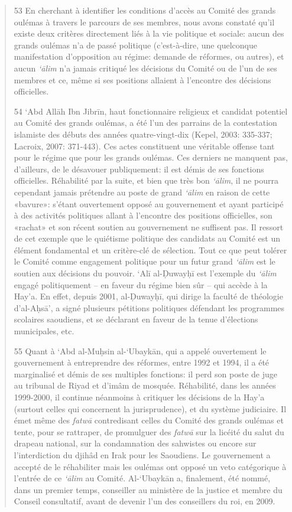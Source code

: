 \begin{quote}
53 En cherchant à identifier les conditions d'accès au Comité des grands
oulémas à travers le parcours de ses membres, nous avons constaté qu'il
existe deux critères directement liés à la vie politique et sociale:
aucun des grands oulémas n'a de passé politique (c'est-à-dire, une
quelconque manifestation d'opposition au régime: demande de réformes, ou
autres), et aucun \emph{`ālim} n'a jamais critiqué les décisions du
Comité ou de l'un de ses membres et ce, même si ses positions allaient à
l'encontre des décisions officielles.

54 `Abd Allāh Ibn Jibrīn, haut fonctionnaire religieux et candidat
potentiel au Comité des grands oulémas, a été l'un des parrains de la
contestation islamiste des débuts des années quatre-vingt-dix (Kepel,
2003: 335-337; Lacroix, 2007: 371-443). Ces actes constituent une
véritable offense tant pour le régime que pour les grands oulémas. Ces
derniers ne manquent pas, d'ailleurs, de le désavouer publiquement: il
est démis de ses fonctions officielles. Réhabilité par la suite, et bien
que très bon \emph{`ālim}, il ne pourra cependant jamais prétendre au
poste de grand \emph{`ālim} en raison de cette «bavure»: s'étant
ouvertement opposé au gouvernement et ayant participé à des activités
politiques allant à l'encontre des positions officielles, son «rachat»
et son récent soutien au gouvernement ne suffisent pas. Il ressort de
cet exemple que le quiétisme politique des candidats au Comité est un
élément fondamental et un critère-clé de sélection. Tout ce que peut
tolérer le Comité comme engagement politique pour un futur grand
\emph{`ālim} est le soutien aux décisions du pouvoir. `Alī al-Ḍuwayḥī
est l'exemple du \emph{`ālim} engagé politiquement -- en faveur du
régime bien sûr -- qui accède à la Hay'a. En effet, depuis 2001,
al-Ḍuwayḥī, qui dirige la faculté de théologie d'al-Aḥsā', a signé
plusieurs pétitions politiques défendant les programmes scolaires
saoudiens, et se déclarant en faveur de la tenue d'élections
municipales, etc.

55 Quant à `Abd al-Muḥsin al-`Ubaykān, qui a appelé ouvertement le
gouvernement à entreprendre des réformes, entre 1992 et 1994, il a été
marginalisé et démis de ses multiples fonctions: il perd son poste de
juge au tribunal de Riyad et d'imâm de mosquée. Réhabilité, dans les
années 1999-2000, il continue néanmoins à critiquer les décisions de la
Hay'a (surtout celles qui concernent la jurisprudence), et du système
judiciaire. Il émet même des \emph{fatwā} contredisant celles du Comité
des grands oulémas et
tente, pour se rattraper, de promulguer des \emph{fatwā} sur la licéité
du salut du drapeau national, sur la condamnation des sahwistes ou
encore sur l'interdiction du djihâd en Irak pour les Saoudiens. Le
gouvernement a accepté de le réhabiliter mais les oulémas ont opposé un
veto catégorique à l'entrée de ce \emph{`ālim} au Comité. Al-`Ubaykān a,
finalement, été nommé, dans un premier temps, conseiller au ministère de
la justice et membre du Conseil consultatif, avant de devenir l'un des
conseillers du roi, en 2009.


\end{quote}
